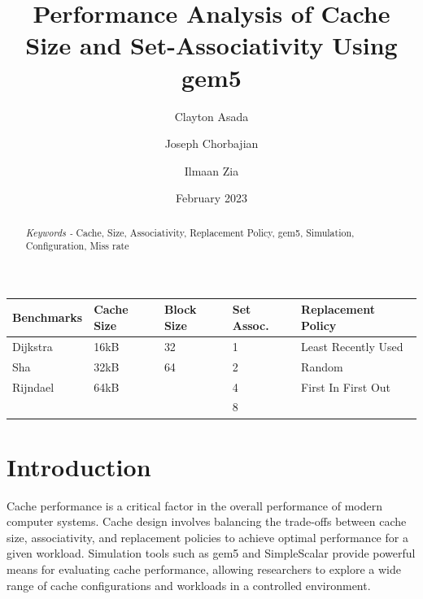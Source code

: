 \documentclass[conference]{IEEEtran}
\begin{document}
\title{Performance Analysis of Cache Size and Set-Associativity Using gem5}

\author[1]{Clayton Asada}
\author[2]{Joseph Chorbajian}
\author[3]{Ilmaan Zia}


\date{February 2023}



\maketitle



\begin{abstract}

\emph{Keywords - } Cache, Size, Associativity, Replacement Policy, gem5, Simulation, Configuration, Miss rate
\end{abstract}


\begin{table}
    \centering
    \begin{tabular}{| m{1.6cm} | m{.75cm} | m{.75cm} | m{.8cm} | m{2.6cm} |}
        \hline
        \textbf{Benchmarks} & \textbf{Cache Size} & \textbf{Block Size}& \textbf{Set Assoc.}& \textbf{Replacement Policy} \\ \hline
        Dijkstra    &   16kB  &   32    &  1   &    Least Recently Used     \\ \hline
        Sha         &   32kB  &   64    &  2   &    Random                  \\ \hline
        Rijndael    &   64kB  &         &  4   &    First In First Out      \\ \hline
                    &         &         &  8   &                            \\ \hline
    \end{tabular}
\end{table}

\section{Introduction}
Cache performance is a critical factor in the overall performance of modern computer systems. Cache design involves balancing the trade-offs between cache size, associativity, and replacement policies to achieve optimal performance for a given workload. Simulation tools such as gem5 and SimpleScalar provide powerful means for evaluating cache performance, allowing researchers to explore a wide range of cache configurations and workloads in a controlled environment.
\end{document}
